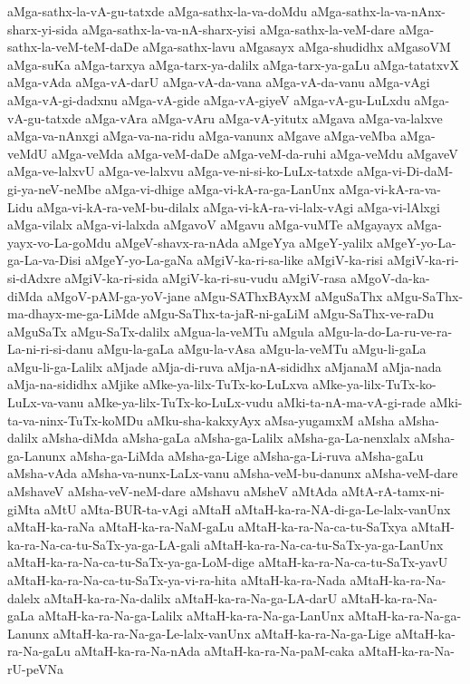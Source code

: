 {aMga-sathx-la-vA-gu-tatxde
aMga-sathx-la-va-doMdu
aMga-sathx-la-va-nAnx-sharx-yi-sida
aMga-sathx-la-va-nA-sharx-yisi
aMga-sathx-la-veM-dare
aMga-sathx-la-veM-teM-daDe
aMga-sathx-lavu
aMgasayx
aMga-shudidhx
aMgasoVM
aMga-suKa
aMga-tarxya
aMga-tarx-ya-dalilx
aMga-tarx-ya-gaLu
aMga-tatatxvX
aMga-vAda
aMga-vA-darU
aMga-vA-da-vana
aMga-vA-da-vanu
aMga-vAgi
aMga-vA-gi-dadxnu
aMga-vA-gide
aMga-vA-giyeV
aMga-vA-gu-LuLxdu
aMga-vA-gu-tatxde
aMga-vAra
aMga-vAru
aMga-vA-yitutx
aMgava
aMga-va-lalxve
aMga-va-nAnxgi
aMga-va-na-ridu
aMga-vanunx
aMgave
aMga-veMba
aMga-veMdU
aMga-veMda
aMga-veM-daDe
aMga-veM-da-ruhi
aMga-veMdu
aMgaveV
aMga-ve-lalxvU
aMga-ve-lalxvu
aMga-ve-ni-si-ko-LuLx-tatxde
aMga-vi-Di-daM-gi-ya-neV-neMbe
aMga-vi-dhige
aMga-vi-kA-ra-ga-LanUnx
aMga-vi-kA-ra-va-Lidu
aMga-vi-kA-ra-veM-bu-dilalx
aMga-vi-kA-ra-vi-lalx-vAgi
aMga-vi-lAlxgi
aMga-vilalx
aMga-vi-lalxda
aMgavoV
aMgavu
aMga-vuMTe
aMgayayx
aMga-yayx-vo-La-goMdu
aMgeV-shavx-ra-nAda
aMgeYya
aMgeY-yalilx
aMgeY-yo-La-ga-La-va-Disi
aMgeY-yo-La-gaNa
aMgiV-ka-ri-sa-like
aMgiV-ka-risi
aMgiV-ka-ri-si-dAdxre
aMgiV-ka-ri-sida
aMgiV-ka-ri-su-vudu
aMgiV-rasa
aMgoV-da-ka-diMda
aMgoV-pAM-ga-yoV-jane
aMgu-SAThxBAyxM
aMguSaThx
aMgu-SaThx-ma-dhayx-me-ga-LiMde
aMgu-SaThx-ta-jaR-ni-gaLiM
aMgu-SaThx-ve-raDu
aMguSaTx
aMgu-SaTx-dalilx
aMgua-la-veMTu
aMgula
aMgu-la-do-La-ru-ve-ra-La-ni-ri-si-danu
aMgu-la-gaLa
aMgu-la-vAsa
aMgu-la-veMTu
aMgu-li-gaLa
aMgu-li-ga-Lalilx
aMjade
aMja-di-ruva
aMja-nA-sididhx
aMjanaM
aMja-nada
aMja-na-sididhx
aMjike
aMke-ya-lilx-TuTx-ko-LuLxva
aMke-ya-lilx-TuTx-ko-LuLx-va-vanu
aMke-ya-lilx-TuTx-ko-LuLx-vudu
aMki-ta-nA-ma-vA-gi-rade
aMki-ta-va-ninx-TuTx-koMDu
aMku-sha-kakxyAyx
aMsa-yugamxM
aMsha
aMsha-dalilx
aMsha-diMda
aMsha-gaLa
aMsha-ga-Lalilx
aMsha-ga-La-nenxlalx
aMsha-ga-Lanunx
aMsha-ga-LiMda
aMsha-ga-Lige
aMsha-ga-Li-ruva
aMsha-gaLu
aMsha-vAda
aMsha-va-nunx-LaLx-vanu
aMsha-veM-bu-danunx
aMsha-veM-dare
aMshaveV
aMsha-veV-neM-dare
aMshavu
aMsheV
aMtAda
aMtA-rA-tamx-ni-giMta
aMtU
aMta-BUR-ta-vAgi
aMtaH
aMtaH-ka-ra-NA-di-ga-Le-lalx-vanUnx
aMtaH-ka-raNa
aMtaH-ka-ra-NaM-gaLu
aMtaH-ka-ra-Na-ca-tu-SaTxya
aMtaH-ka-ra-Na-ca-tu-SaTx-ya-ga-LA-gali
aMtaH-ka-ra-Na-ca-tu-SaTx-ya-ga-LanUnx
aMtaH-ka-ra-Na-ca-tu-SaTx-ya-ga-LoM-dige
aMtaH-ka-ra-Na-ca-tu-SaTx-yavU
aMtaH-ka-ra-Na-ca-tu-SaTx-ya-vi-ra-hita
aMtaH-ka-ra-Nada
aMtaH-ka-ra-Na-dalelx
aMtaH-ka-ra-Na-dalilx
aMtaH-ka-ra-Na-ga-LA-darU
aMtaH-ka-ra-Na-gaLa
aMtaH-ka-ra-Na-ga-Lalilx
aMtaH-ka-ra-Na-ga-LanUnx
aMtaH-ka-ra-Na-ga-Lanunx
aMtaH-ka-ra-Na-ga-Le-lalx-vanUnx
aMtaH-ka-ra-Na-ga-Lige
aMtaH-ka-ra-Na-gaLu
aMtaH-ka-ra-Na-nAda
aMtaH-ka-ra-Na-paM-caka
aMtaH-ka-ra-Na-rU-peVNa
}
